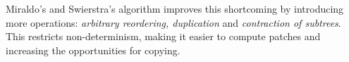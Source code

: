 Miraldo's and Swierstra's algorithm improves this shortcoming by introducing more operations: \textit{arbitrary reordering, duplication} and \textit{contraction of subtrees}. This restricts non-determinism, making it easier to compute patches and increasing the opportunities for copying.



    


